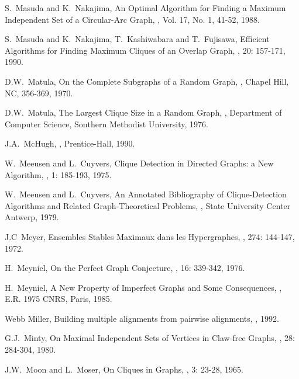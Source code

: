 \begin{thebibliography}{10}
S.~Masuda and K.~Nakajima,
\newblock An Optimal Algorithm for Finding a Maximum Independent Set
of a Circular-Arc Graph,
, Vol. 17, No. 1, 41-52, 1988.

S.~Masuda and K.~Nakajima, T.~Kashiwabara and T.~Fujisawa,
\newblock Efficient Algorithms for Finding Maximum Cliques of an
Overlap Graph,
, 20: 157-171, 1990.

D.W.~Matula,
\newblock On the Complete Subgraphs of a Random Graph,
, Chapel
Hill, NC, 356-369, 1970.

D.W.~Matula,
\newblock The Largest Clique Size in a Random Graph,
, Department of Computer
Science, Southern Methodist University, 1976.

J.A.~McHugh,
,
\newblock Prentice-Hall, 1990.

W.~Meeusen and L.~Cuyvers,
\newblock Clique Detection in Directed Graphs: a New Algorithm,
, 1: 185-193, 1975.

W.~Meeusen and L.~Cuyvers,
\newblock An Annotated Bibliography of Clique-Detection Algorithms
and Related Graph-Theoretical Problems,
, State University Center
Antwerp, 1979.

J.C~Meyer,
\newblock Ensembles Stables Maximaux dans les Hypergraphes,
, 274: 144-147,
1972.

H.~Meyniel,
\newblock On the Perfect Graph Conjecture,
, 16: 339-342, 1976.

H.~Meyniel,
\newblock A New Property of Imperfect Graphs and Some Consequences,
, E.R. 1975 CNRS, Paris, 1985.

Webb Miller,
\newblock Building multiple alignments from pairwise alignments,
, 1992.

G.J.~Minty,
\newblock On Maximal Independent Sets of Vertices in Claw-free
Graphs,
, 28: 284-304, 1980.

J.W.~Moon and L.~Moser,
\newblock On Cliques in Graphs,
, 3: 23-28, 1965.


\end{thebibliography}
